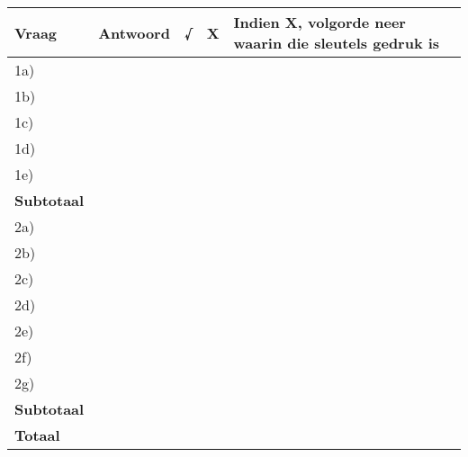 \begin{table}[H]
 \begin{center}
  \begin{tabular}{|p{1.5cm}|p{1.5cm}|p{1cm}|p{1cm}|p{6cm}|} \hline

\textbf{Vraag} & \textbf{Antwoord} & \textbf{√} & \textbf{X} & \textbf{Indien X, volgorde neer waarin die sleutels gedruk is} \\ \hline
1a) &&&&\\ \hline
1b)&&&&\\ \hline
1c)&&&&\\ \hline
1d)&&&&\\ \hline
1e)&&&&\\ \hline
\textbf{Subtotaal}&&&&\\ \hline
2a)&&&&\\ \hline
2b)&&&&\\ \hline
2c)&&&&\\ \hline
2d)&&&&\\ \hline
2e)&&&&\\ \hline
2f)&&&&\\ \hline
2g)&&&&\\ \hline
\textbf{Subtotaal}&&&&\\ \hline
\textbf{Totaal}&&&& \\ \hline


   
  \end{tabular}

 \end{center}

\end{table}

